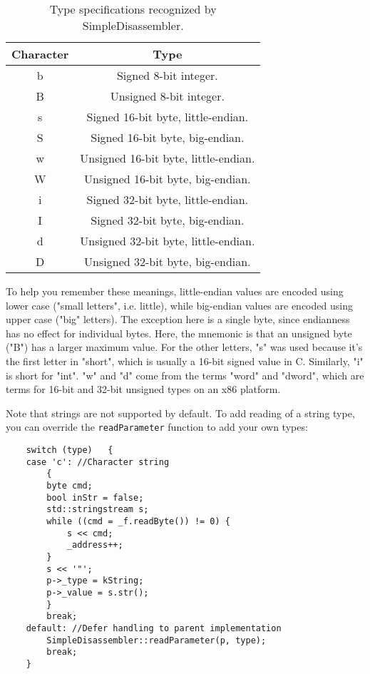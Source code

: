 \begin{table}[!hpbt]
\centering
\begin{tabular}{c | c}
Character & Type \\
\hline
b & Signed 8-bit integer. \\
B & Unsigned 8-bit integer. \\
s & Signed 16-bit byte, little-endian. \\
S & Signed 16-bit byte, big-endian. \\
w & Unsigned 16-bit byte, little-endian. \\
W & Unsigned 16-bit byte, big-endian. \\
i & Signed 32-bit byte, little-endian. \\
I & Signed 32-bit byte, big-endian. \\
d & Unsigned 32-bit byte, little-endian. \\
D & Unsigned 32-bit byte, big-endian. \\
\end{tabular}
\caption{Type specifications recognized by SimpleDisassembler.}
\label{tbl:paramtypes}
\end{table}

To help you remember these meanings, little-endian values are encoded using lower case ("small letters", i.e. little), while big-endian values are encoded using upper case ("big" letters). The exception here is a single byte, since endianness has no effect for individual bytes. Here, the mnemonic is that an unsigned byte ("B") has a larger maximum value. For the other letters, "s" was used because it's the first letter in "short", which is usually a 16-bit signed value in C. Similarly, "i" is short for "int". "w" and "d" come from the terms "word" and "dword", which are terms for 16-bit and 32-bit unsigned types on an x86 platform.

Note that strings are not supported by default. To add reading of a string type, you can override the \verb+readParameter+ function to add your own types:

\begin{C++}
\begin{lstlisting}
	switch (type)	{
	case 'c': //Character string
		{
		byte cmd;
		bool inStr = false;
		std::stringstream s;
		while ((cmd = _f.readByte()) != 0) {
			s << cmd;
			_address++;
		}
		s << '"';
		p->_type = kString;
		p->_value = s.str();
		}
		break;
	default: //Defer handling to parent implementation
		SimpleDisassembler::readParameter(p, type);
		break;
	}
\end{lstlisting}
\end{C++}

